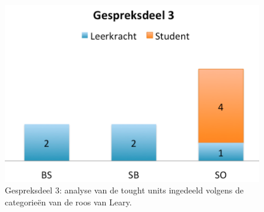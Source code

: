 \documentclass[a4paper,12pt]{article}
\theoremstyle{definition}
\begin{document}
\begin{figure}
  \centering
  \includegraphics[scale=0.6]{grafiek4.png}\caption{Gespreksdeel 3: analyse van 
de tought units ingedeeld volgens de categorieën van de roos van Leary.}\label{4}
\end{figure}
\newpage
\end{document}
